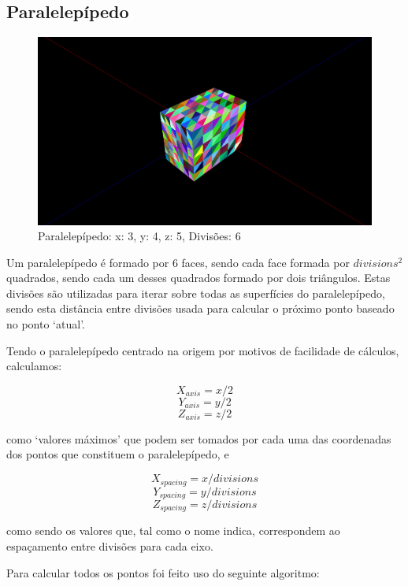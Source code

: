 \documentclass[a4paper]{article}
\begin{document}
\subsection{Paralelepípedo}
\begin{figure}[H]
    \centering
    \includegraphics[width=0.5\linewidth]{box.png}
    \caption{Paralelepípedo: x: 3, y: 4, z: 5, Divisões: 6}
\end{figure}

Um paralelepípedo é formado por 6 faces, sendo cada face formada por $divisions^2$ quadrados, sendo cada um desses quadrados formado por dois triângulos. Estas divisões são utilizadas para iterar sobre todas as superfícies do paralelepípedo, sendo esta distância entre divisões usada para calcular o próximo ponto baseado no ponto `atual'.

Tendo o paralelepípedo centrado na origem por motivos de facilidade de cálculos, calculamos:

\[X_{axis} = x / 2\]
\[Y_{axis} = y / 2\]
\[Z_{axis} = z / 2\]

como `valores máximos' que podem ser tomados por cada uma das coordenadas dos pontos que constituem o paralelepípedo, e

\[X_{spacing} = x / divisions\]
\[Y_{spacing} = y / divisions\]
\[Z_{spacing} = z / divisions\]

como sendo os valores que, tal como o nome indica, correspondem ao espaçamento entre divisões para cada eixo.

Para calcular todos os pontos foi feito uso do seguinte algoritmo:
\end{document}
